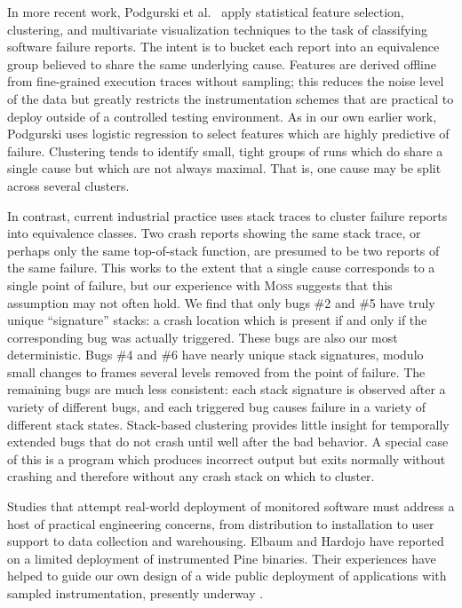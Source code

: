 \documentclass{sig-alternate}
\newcommand{\moss}{\textsc{Moss}\xspace}
\begin{document}
In more recent work, Podgurski et al.\ \cite{ICSE`03*465} apply
statistical feature selection, clustering, and multivariate
visualization techniques to the task of classifying software failure
reports.  The intent is to bucket each report into an equivalence
group believed to share the same underlying cause.  Features are
derived offline from fine-grained execution traces without sampling;
this reduces the noise level of the data but greatly restricts the
instrumentation schemes that are practical to deploy outside of a
controlled testing environment.  As in our own earlier work, Podgurski
uses logistic regression to select features which are highly
predictive of failure.  
Clustering tends to identify small, tight groups of runs which do
share a single cause but which are not always maximal.  That is, one
cause may be split across several clusters.

In contrast, current
industrial practice uses stack traces to cluster failure reports into
equivalence classes.  Two crash reports showing the same stack trace,
or perhaps only the same top-of-stack function, are presumed to be two
reports of the same failure.  This works to the extent that a single
cause corresponds to a single point of failure, but our experience
with \moss suggests that this assumption may not often hold.  We find
that only bugs \#2 and \#5 have truly unique ``signature'' stacks: a
crash location which is present if and only if the corresponding bug
was actually triggered.  These bugs are also our most deterministic.
Bugs \#4 and \#6 have nearly unique stack signatures, modulo small
changes to frames several levels removed from the point of failure.
The remaining bugs are much less consistent: each stack signature is
observed after a variety of different bugs, and each triggered bug
causes failure in a variety of different stack states.  Stack-based
clustering provides little insight for temporally extended bugs that
do not crash until well after the bad behavior.  A special case of
this is a program which produces incorrect output but exits normally
without crashing and therefore without any crash stack on which to
cluster.

Studies that attempt real-world deployment of monitored software must
address a host of practical engineering concerns, from distribution to
installation to user support to data collection and warehousing.
Elbaum and Hardojo \cite{Elbaum:2003:DISATA} have reported on a
limited deployment of instrumented Pine binaries.  Their experiences
have helped to guide our own design of a wide public deployment of
applications with sampled instrumentation, presently underway
\cite{Liblit:2003:CBIP}.
\end{document}
